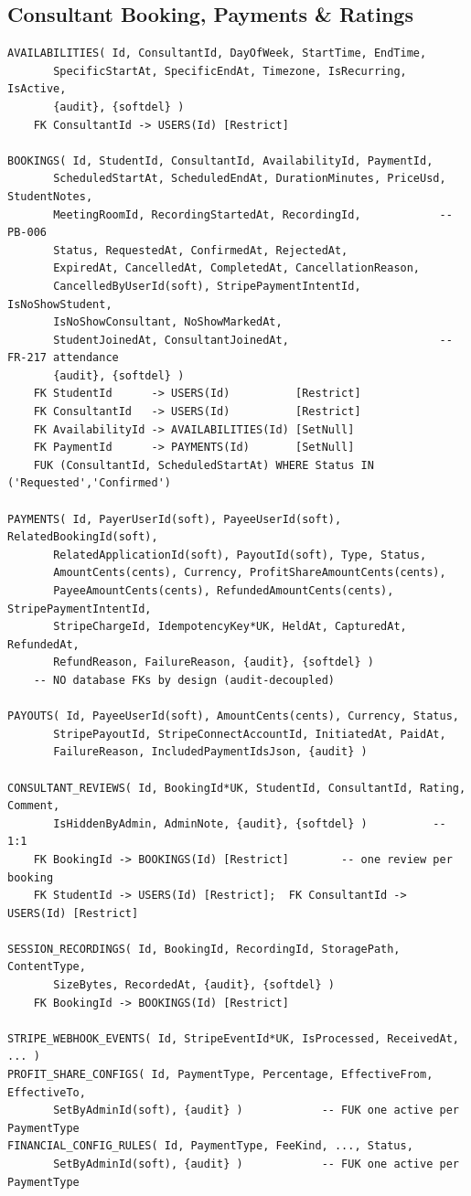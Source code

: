 \documentclass[11pt,a4paper]{article}
\begin{document}
\subsection{Consultant Booking, Payments \& Ratings}
{\footnotesize\begin{verbatim}
AVAILABILITIES( Id, ConsultantId, DayOfWeek, StartTime, EndTime,
       SpecificStartAt, SpecificEndAt, Timezone, IsRecurring, IsActive,
       {audit}, {softdel} )
    FK ConsultantId -> USERS(Id) [Restrict]

BOOKINGS( Id, StudentId, ConsultantId, AvailabilityId, PaymentId,
       ScheduledStartAt, ScheduledEndAt, DurationMinutes, PriceUsd, StudentNotes,
       MeetingRoomId, RecordingStartedAt, RecordingId,            -- PB-006
       Status, RequestedAt, ConfirmedAt, RejectedAt,
       ExpiredAt, CancelledAt, CompletedAt, CancellationReason,
       CancelledByUserId(soft), StripePaymentIntentId, IsNoShowStudent,
       IsNoShowConsultant, NoShowMarkedAt,
       StudentJoinedAt, ConsultantJoinedAt,                       -- FR-217 attendance
       {audit}, {softdel} )
    FK StudentId      -> USERS(Id)          [Restrict]
    FK ConsultantId   -> USERS(Id)          [Restrict]
    FK AvailabilityId -> AVAILABILITIES(Id) [SetNull]
    FK PaymentId      -> PAYMENTS(Id)       [SetNull]
    FUK (ConsultantId, ScheduledStartAt) WHERE Status IN ('Requested','Confirmed')

PAYMENTS( Id, PayerUserId(soft), PayeeUserId(soft), RelatedBookingId(soft),
       RelatedApplicationId(soft), PayoutId(soft), Type, Status,
       AmountCents(cents), Currency, ProfitShareAmountCents(cents),
       PayeeAmountCents(cents), RefundedAmountCents(cents), StripePaymentIntentId,
       StripeChargeId, IdempotencyKey*UK, HeldAt, CapturedAt, RefundedAt,
       RefundReason, FailureReason, {audit}, {softdel} )
    -- NO database FKs by design (audit-decoupled)

PAYOUTS( Id, PayeeUserId(soft), AmountCents(cents), Currency, Status,
       StripePayoutId, StripeConnectAccountId, InitiatedAt, PaidAt,
       FailureReason, IncludedPaymentIdsJson, {audit} )

CONSULTANT_REVIEWS( Id, BookingId*UK, StudentId, ConsultantId, Rating, Comment,
       IsHiddenByAdmin, AdminNote, {audit}, {softdel} )          -- 1:1
    FK BookingId -> BOOKINGS(Id) [Restrict]        -- one review per booking
    FK StudentId -> USERS(Id) [Restrict];  FK ConsultantId -> USERS(Id) [Restrict]

SESSION_RECORDINGS( Id, BookingId, RecordingId, StoragePath, ContentType,
       SizeBytes, RecordedAt, {audit}, {softdel} )
    FK BookingId -> BOOKINGS(Id) [Restrict]

STRIPE_WEBHOOK_EVENTS( Id, StripeEventId*UK, IsProcessed, ReceivedAt, ... )
PROFIT_SHARE_CONFIGS( Id, PaymentType, Percentage, EffectiveFrom, EffectiveTo,
       SetByAdminId(soft), {audit} )            -- FUK one active per PaymentType
FINANCIAL_CONFIG_RULES( Id, PaymentType, FeeKind, ..., Status,
       SetByAdminId(soft), {audit} )            -- FUK one active per PaymentType
\end{verbatim}}
\end{document}
